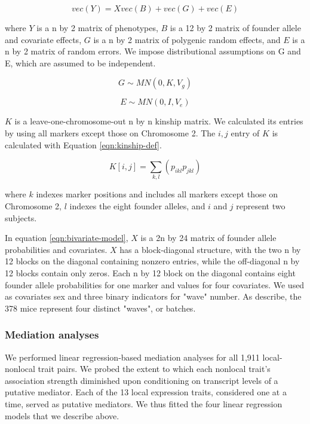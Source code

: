 \documentclass{article}
\begin{document}
\begin{equation}
    vec(Y) = Xvec(B) + vec(G) + vec(E)
    \label{eqn:bivariate-model}
\end{equation}

where $Y$ is a n by 2 matrix of phenotypes, $B$ is a 12 by 2 matrix of founder allele and covariate effects, $G$ is a n by 2 matrix of polygenic random effects, and $E$ is a n by 2 matrix of random errors. We impose distributional assumptions on G and E, which are assumed to be independent.

\begin{equation}
    G \sim MN(0, K, V_g)
\end{equation}

\begin{equation}
    E \sim MN(0, I, V_e)
\end{equation}

$K$ is a leave-one-chromosome-out n by n kinship matrix. We calculated its entries by using all markers except those on Chromosome 2. The $i, j$ entry of $K$ is calculated with Equation \ref{eqn:kinship-def}.

\begin{equation}
    K[i, j] = \sum_{k,l} (p_{ikl} p_{jkl})
    \label{eqn:kinship-def}
\end{equation}

where $k$ indexes marker positions and includes all markers except those on Chromosome 2, $l$ indexes the eight founder alleles, and $i$ and $j$ represent two subjects. 

In equation \ref{eqn:bivariate-model}, $X$ is a 2n by 24 matrix of founder allele probabilities and covariates. $X$ has a block-diagonal structure, with the two n by 12 blocks on the diagonal containing nonzero entries, while the off-diagonal n by 12 blocks contain only zeros. Each n by 12 block on the diagonal contains eight founder allele probabilities for one marker and values for four covariates. We used as covariates sex and three binary indicators for "wave" number. As \citet{keller2018genetic} describe, the 378 mice represent four distinct "waves", or batches.

\subsubsection{Mediation analyses}

We performed linear regression-based mediation analyses for all 1,911 local-nonlocal trait pairs. We probed the extent to which each nonlocal trait's association strength diminished upon conditioning on transcript levels of a putative mediator. Each of the 13 local expression traits, considered one at a time, served as putative mediators. We thus fitted the four linear regression models that we describe above. 
\end{document}
